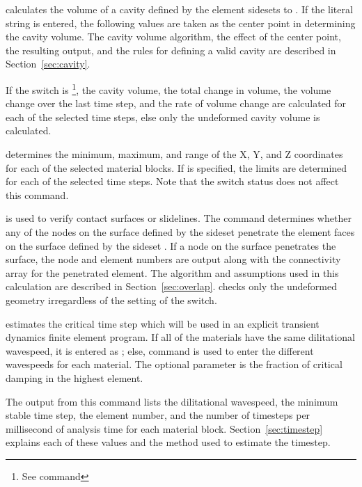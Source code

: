  {
 calculates the volume of a cavity defined by the element
sidesets  to .  If the literal string
 is entered, the following values are taken as the
center point in determining the cavity volume. The cavity volume
algorithm, the effect of the center point, the resulting output, and the
rules for defining a valid cavity are described in
Section~\ref{sec:cavity}. 

If the  switch is \footnote{See command
}, the cavity volume, the total change in volume, the volume
change over the last time step, and the rate of volume change are
calculated for each of the selected time steps, else only the undeformed
cavity volume is calculated. 
}

 {
 determines the minimum, maximum, and range of the 
X, Y, and Z coordinates for each of the selected material blocks.
If  is specified, the limits are determined for each of
the selected time steps.  Note that the  switch status does
not affect this command.
}

 {
 is used to verify contact surfaces or slidelines.  The
command determines whether any of the nodes on the surface defined by
the sideset  penetrate the element faces on the surface
defined by the sideset .  If a node on the
 surface penetrates the  surface, the
node and element numbers are output along with the connectivity array
for the penetrated element. The algorithm and assumptions used in this
calculation are described in Section~\ref{sec:overlap}.  
checks only the undeformed geometry irregardless of the setting of the
 switch. 
}

 {
 estimates the critical time step which will be used in an
explicit transient dynamics finite element program. If all of the
materials have the same dilitational wavespeed, it is entered as
; else, command  is used to enter the
different wavespeeds for each material.  The optional parameter
 is the fraction of critical damping in the
highest element. 

The output from this command lists the dilitational wavespeed, the
minimum stable time step, the element number, and the number of
timesteps per millisecond of analysis time for each material block.
Section~\ref{sec:timestep} explains each of these values and the method
used to estimate the timestep. 
} 


